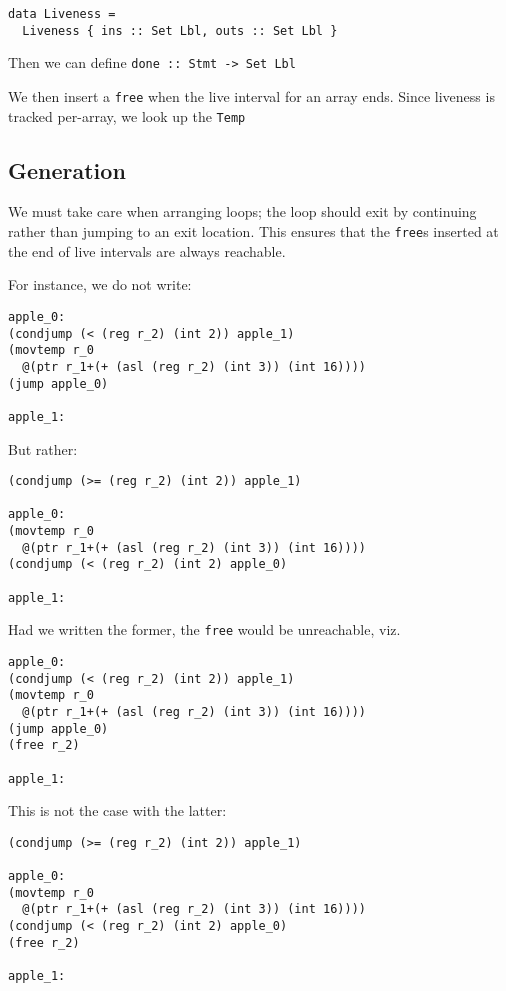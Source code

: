 \documentclass[sigplan,screen,anonymous]{acmart}
\begin{document}
\begin{verbatim}
data Liveness =
  Liveness { ins :: Set Lbl, outs :: Set Lbl }
\end{verbatim}

Then we can define {\tt done :: Stmt -> Set Lbl}

We then insert a {\tt free} when the live interval for an array ends. Since liveness is tracked per-array, we look up the {\tt Temp}

\subsection{Generation}

We must take care when arranging loops; the loop should exit by continuing rather than jumping to an exit location. This ensures that the {\tt free}s inserted at the end of live intervals are always reachable.

For instance, we do not write:

\begin{verbatim}
apple_0:
(condjump (< (reg r_2) (int 2)) apple_1)
(movtemp r_0
  @(ptr r_1+(+ (asl (reg r_2) (int 3)) (int 16))))
(jump apple_0)

apple_1:
\end{verbatim}

But rather:

\begin{verbatim}
(condjump (>= (reg r_2) (int 2)) apple_1)

apple_0:
(movtemp r_0
  @(ptr r_1+(+ (asl (reg r_2) (int 3)) (int 16))))
(condjump (< (reg r_2) (int 2) apple_0)

apple_1:
\end{verbatim}

Had we written the former, the {\tt free} would be unreachable, viz.

\begin{verbatim}
apple_0:
(condjump (< (reg r_2) (int 2)) apple_1)
(movtemp r_0
  @(ptr r_1+(+ (asl (reg r_2) (int 3)) (int 16))))
(jump apple_0)
(free r_2)

apple_1:
\end{verbatim}

This is not the case with the latter:

\begin{verbatim}
(condjump (>= (reg r_2) (int 2)) apple_1)

apple_0:
(movtemp r_0
  @(ptr r_1+(+ (asl (reg r_2) (int 3)) (int 16))))
(condjump (< (reg r_2) (int 2) apple_0)
(free r_2)

apple_1:
\end{verbatim}
\end{document}
